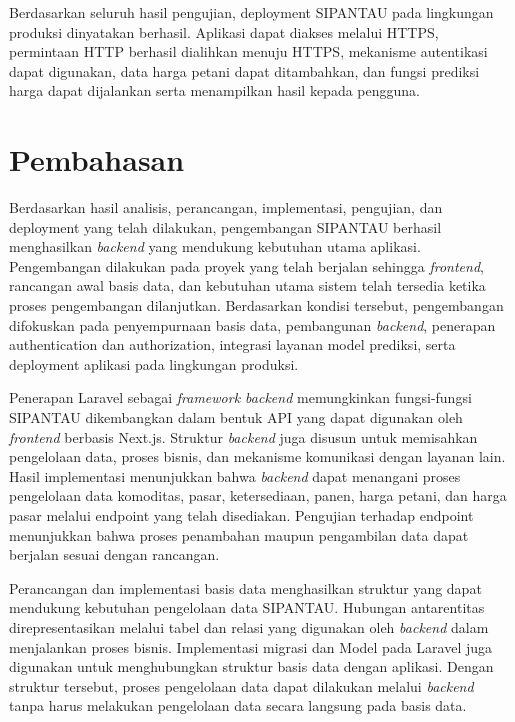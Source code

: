 Berdasarkan seluruh hasil pengujian, deployment SIPANTAU pada lingkungan produksi dinyatakan berhasil. Aplikasi dapat diakses melalui HTTPS, permintaan HTTP berhasil dialihkan menuju HTTPS, mekanisme autentikasi dapat digunakan, data harga petani dapat ditambahkan, dan fungsi prediksi harga dapat dijalankan serta menampilkan hasil kepada pengguna.

\section{Pembahasan}

Berdasarkan hasil analisis, perancangan, implementasi, pengujian, dan deployment yang telah dilakukan, pengembangan SIPANTAU berhasil menghasilkan \textit{backend} yang mendukung kebutuhan utama aplikasi. Pengembangan dilakukan pada proyek yang telah berjalan sehingga \textit{frontend}, rancangan awal basis data, dan kebutuhan utama sistem telah tersedia ketika proses pengembangan dilanjutkan. Berdasarkan kondisi tersebut, pengembangan difokuskan pada penyempurnaan basis data, pembangunan \textit{backend}, penerapan authentication dan authorization, integrasi layanan model prediksi, serta deployment aplikasi pada lingkungan produksi.

Penerapan Laravel sebagai \textit{framework backend} memungkinkan fungsi-fungsi SIPANTAU dikembangkan dalam bentuk API yang dapat digunakan oleh \textit{frontend} berbasis Next.js. Struktur \textit{backend} juga disusun untuk memisahkan pengelolaan data, proses bisnis, dan mekanisme komunikasi dengan layanan lain. Hasil implementasi menunjukkan bahwa \textit{backend} dapat menangani proses pengelolaan data komoditas, pasar, ketersediaan, panen, harga petani, dan harga pasar melalui endpoint yang telah disediakan. Pengujian terhadap endpoint menunjukkan bahwa proses penambahan maupun pengambilan data dapat berjalan sesuai dengan rancangan.

Perancangan dan implementasi basis data menghasilkan struktur yang dapat mendukung kebutuhan pengelolaan data SIPANTAU. Hubungan antarentitas direpresentasikan melalui tabel dan relasi yang digunakan oleh \textit{backend} dalam menjalankan proses bisnis. Implementasi migrasi dan Model pada Laravel juga digunakan untuk menghubungkan struktur basis data dengan aplikasi. Dengan struktur tersebut, proses pengelolaan data dapat dilakukan melalui \textit{backend} tanpa harus melakukan pengelolaan data secara langsung pada basis data.

